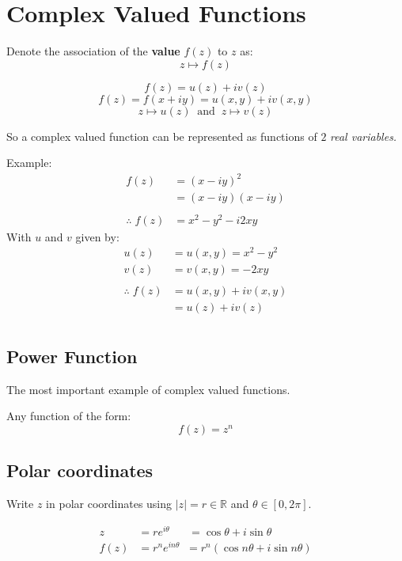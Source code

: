 \section{Complex Valued Functions}
Denote the association of the \textbf{value} $f(z)$ to $z$ as:
\[z \mapsto f(z) \]

\begin{defn}
	\[f(z) = u(z) +iv(z)\]
	\[f(z) = f(x + iy) = u(x,y) + iv(x,y)\]
	\[z \mapsto u(z) \;\; \text{and} \;\;  z \mapsto v(z) \]
\end{defn}

So a complex valued function can be represented as functions of $2$ \textit{real variables.}

Example:
\begin{align*}
	f(z) &= (x - iy)^2 \\
	&= (x - iy)(x - iy) \\
	\\
	\therefore \; f(z) &= x^2 - y^2 - i2xy
\end{align*}
With $u$ and $v$ given by:
\begin{align*}
	u(z) &= u(x, y) = x^2 - y^2 \\
	v(z) &= v(x, y) = -2xy \\
	\\
	\therefore \; f(z) &= u(x, y) + iv(x, y) \\
	&= u(z) + iv(z) \\
\end{align*}

\subsection{Power Function}
The most important example of complex valued functions.
\begin{defn}
Any function of the form:
	\[f(z) = z^n\]
\end{defn}

\subsection{Polar coordinates}
Write $z$ in polar coordinates using $|z| = r \in \mathbb{R}$ and $\theta \in [0, 2\pi]$.

\begin{defn}
	\begin{align*}
		z &= re^{i\theta} \;\;\;\;\;\; = \cos{\theta} + i\sin{\theta} \\
		f(z) &= r^ne^{in\theta} \;\; = r^n(\cos{n\theta} + i\sin{n\theta}) \\
	\end{align*}
\end{defn}


